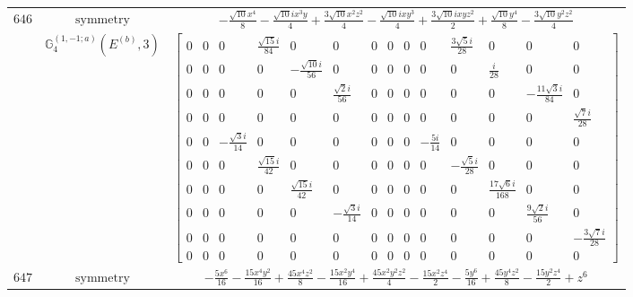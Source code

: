 \documentclass[fleqn,8pt,landscape]{jsarticle}
\begin{document}
\begin{longtable}{ccc}
$ 646 $ & $ \text{symmetry} $ & $ - \frac{\sqrt{10} x^{4}}{8} - \frac{\sqrt{10} i x^{3} y}{4} + \frac{3 \sqrt{10} x^{2} z^{2}}{4} - \frac{\sqrt{10} i x y^{3}}{4} + \frac{3 \sqrt{10} i x y z^{2}}{2} + \frac{\sqrt{10} y^{4}}{8} - \frac{3 \sqrt{10} y^{2} z^{2}}{4} $ \\
$  $ & $ \mathbb{G}_{4}^{(1,-1;a)}(E^{(b)},3) $ & $ \begin{bmatrix} 0 & 0 & 0 & \frac{\sqrt{15} i}{84} & 0 & 0 & 0 & 0 & 0 & 0 & \frac{3 \sqrt{5} i}{28} & 0 & 0 & 0 \\ 0 & 0 & 0 & 0 & - \frac{\sqrt{10} i}{56} & 0 & 0 & 0 & 0 & 0 & 0 & \frac{i}{28} & 0 & 0 \\ 0 & 0 & 0 & 0 & 0 & \frac{\sqrt{2} i}{56} & 0 & 0 & 0 & 0 & 0 & 0 & - \frac{11 \sqrt{3} i}{84} & 0 \\ 0 & 0 & 0 & 0 & 0 & 0 & 0 & 0 & 0 & 0 & 0 & 0 & 0 & \frac{\sqrt{7} i}{28} \\ 0 & 0 & - \frac{\sqrt{3} i}{14} & 0 & 0 & 0 & 0 & 0 & 0 & - \frac{5 i}{14} & 0 & 0 & 0 & 0 \\ 0 & 0 & 0 & \frac{\sqrt{15} i}{42} & 0 & 0 & 0 & 0 & 0 & 0 & - \frac{\sqrt{5} i}{28} & 0 & 0 & 0 \\ 0 & 0 & 0 & 0 & \frac{\sqrt{15} i}{42} & 0 & 0 & 0 & 0 & 0 & 0 & \frac{17 \sqrt{6} i}{168} & 0 & 0 \\ 0 & 0 & 0 & 0 & 0 & - \frac{\sqrt{3} i}{14} & 0 & 0 & 0 & 0 & 0 & 0 & \frac{9 \sqrt{2} i}{56} & 0 \\ 0 & 0 & 0 & 0 & 0 & 0 & 0 & 0 & 0 & 0 & 0 & 0 & 0 & - \frac{3 \sqrt{7} i}{28} \\ 0 & 0 & 0 & 0 & 0 & 0 & 0 & 0 & 0 & 0 & 0 & 0 & 0 & 0 \end{bmatrix} $ \\ \hline
$ 647 $ & $ \text{symmetry} $ & $ - \frac{5 x^{6}}{16} - \frac{15 x^{4} y^{2}}{16} + \frac{45 x^{4} z^{2}}{8} - \frac{15 x^{2} y^{4}}{16} + \frac{45 x^{2} y^{2} z^{2}}{4} - \frac{15 x^{2} z^{4}}{2} - \frac{5 y^{6}}{16} + \frac{45 y^{4} z^{2}}{8} - \frac{15 y^{2} z^{4}}{2} + z^{6} $ \\

\end{longtable}
\end{document}
